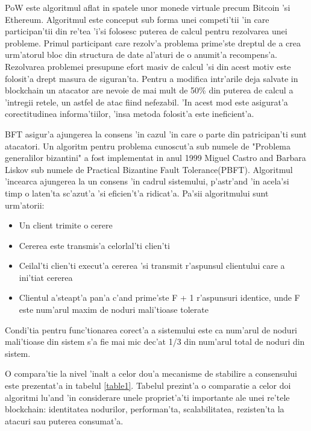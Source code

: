 \documentclass[12pt,a4paper,twoside]{report}
\begin{document}
		PoW este algoritmul aflat in spatele unor monede virtuale precum Bitcoin 'si Ethereum. Algoritmul este conceput sub forma unei competi'tii 'in care participan'tii din re'tea 'i'si folosesc puterea de calcul pentru rezolvarea unei probleme\cite{pow}. Primul participant care rezolv'a problema prime'ste dreptul de a crea urm'atorul bloc din structura de date al'aturi de o anumit'a recompens'a. Rezolvarea problemei presupune efort masiv de calcul\cite{energy-bit} 'si din acest motiv este folosit'a drept masura de siguran'ta. Pentru a modifica intr'arile deja salvate in blockchain un atacator are nevoie de mai mult de 50\% din puterea de calcul a 'intregii retele, un astfel de atac fiind nefezabil. 'In acest mod este asigurat'a corectitudinea informa'tiilor, 'insa metoda folosit'a este ineficient'a.
		
		BFT asigur'a ajungerea la consens 'in cazul 'in care o parte din patricipan'ti sunt atacatori. Un algoritm pentru problema  cunoscut'a sub numele de "Problema generalilor bizantini"\cite{generals} a fost implementat in anul 1999 Miguel Castro and Barbara Liskov sub numele de Practical Bizantine Fault Tolerance(PBFT)\cite{pbft}. Algoritmul 'incearca ajungerea la un consens 'in cadrul sistemului, p'astr'and 'in acela'si timp o laten'ta sc'azut'a 'si eficien't'a ridicat'a. Pa'sii algoritmului sunt urm'atorii:
		\begin{itemize}
			\item Un client trimite o cerere 
			\item Cererea este transmis'a celorlal'ti clien'ti
			\item Ceilal'ti clien'ti execut'a cererea 'si transmit r'aspunsul clientului care a ini'tiat cererea
			\item Clientul a'steapt'a pan'a c'and prime'ste F + 1 r'aspunsuri identice, unde F este num'arul maxim de noduri mali'tioase tolerate
			
		\end{itemize}
		Condi'tia pentru func'tionarea corect'a a sistemului este ca num'arul de noduri mali'tioase din sistem s'a fie mai mic dec'at 1/3 din num'arul total de noduri din sistem.
		
		O compara'tie la nivel 'inalt a celor dou'a mecanisme de stabilire a consensului este prezentat'a in tabelul \ref{table1}. Tabelul prezint'a o comparatie a celor doi algoritmi lu'and 'in considerare unele propriet'a'ti importante ale unei re'tele blockchain: identitatea nodurilor, performan'ta, scalabilitatea, rezisten'ta la atacuri sau puterea consumat'a.
		
\end{document}
